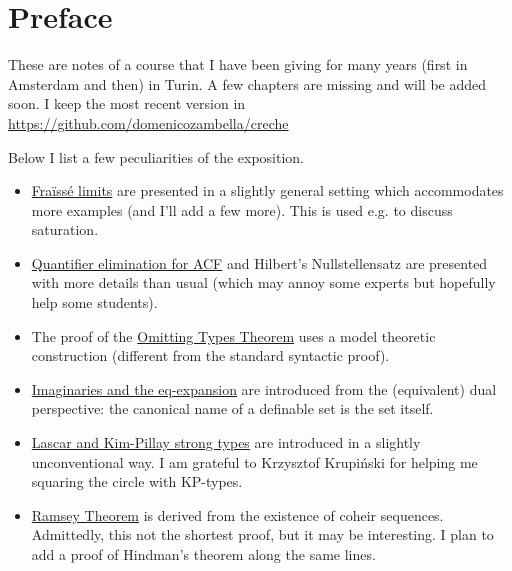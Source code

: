 \documentclass[creche.tex]{subfiles}
\begin{document}
\chapter*{Preface}
\label{praface}

These are notes of a course that I have been giving for many years (first in Amsterdam and then) in Turin. A few chapters are missing and will be added soon. I keep the most recent version in
\url{https://github.com/domenicozambella/creche}


Below I list a few peculiarities of the exposition.

\begin{itemize}
\item \hyperref[rich]{Fraïssé limits} are presented in a slightly general setting which accommodates more examples (and I'll add a few more). This is used e.g. to discuss saturation.
\item \hyperref[algebraic]{Quantifier elimination for ACF} and Hilbert's Nullstellensatz are presented with more details than usual (which may annoy some experts but hopefully help some students).
\item The proof of the \hyperref[countable]{Omitting Types Theorem} uses a model theoretic construction (different from the standard syntactic proof).
\item \hyperref[imaginary]{Imaginaries and the eq-expansion} are introduced from the (equivalent) dual perspective: the canonical name of a definable set is the set itself.
\item \hyperref[invariantL]{Lascar and Kim-Pillay strong types} are introduced in a slightly unconventional way. I am grateful to Krzysztof Krupiński for helping me squaring the circle with KP-types.
\item \hyperref[Ramsey]{Ramsey Theorem} is derived from the existence of coheir sequences. Admittedly, this not the shortest proof, but it may be interesting. I plan to add a proof of Hindman's theorem along the same lines.
\end{itemize}
\end{document}
